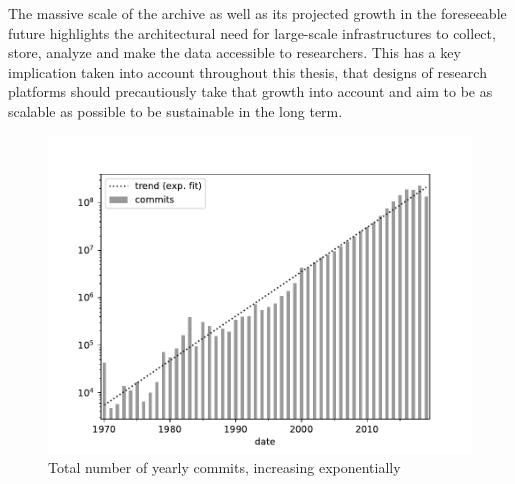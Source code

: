 The massive scale of the archive as well as its projected growth in the
foreseeable future highlights the architectural need for large-scale
infrastructures to collect, store, analyze and make the data accessible to
researchers. This has a key implication taken into account throughout this
thesis, that designs of research platforms should precautiously take that
growth into account and aim to be as scalable as possible to be sustainable in
the long term.

\begin{figure}
    \centering
    \includegraphics[width=0.5\linewidth]{img/commit-growth}
    \caption{Total number of yearly commits, increasing
    exponentially~\cite{ieee-sw-gender-swh}}%
    \label{fig:swh-commit-growth}
\end{figure}
